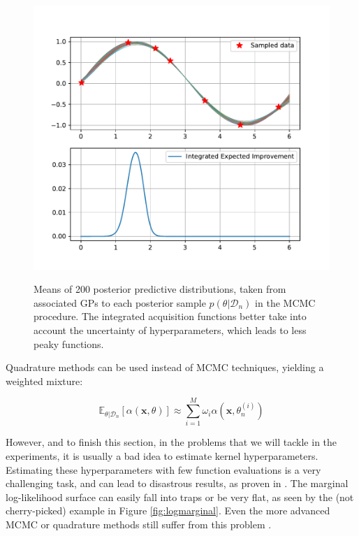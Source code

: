 \documentclass[10pt,a4paper,twoside]{book}
\begin{document}
\begin{figure}
\centering
\caption{Means of 200 posterior predictive distributions, taken from associated GPs to each posterior sample $p(\theta|\mathcal{D}_n)$ in the MCMC procedure. The integrated acquisition functions better take into account the uncertainty of hyperparameters, which leads to less peaky functions.}
\includegraphics[width=\textwidth]{figures/chapter3/integratedacq}
\label{fig:integratedacq}
\end{figure}


Quadrature methods can be used instead of MCMC techniques, yielding a weighted mixture:

\begin{equation}
\mathbb{E}_{\theta|\mathcal{D}_n}\left[ \alpha(\boldsymbol{x},\theta )\right] \approx \sum_{i=1}^M \omega_i \alpha(\boldsymbol{x},\theta_n^{(i)})
\end{equation}

However, and to finish this section, in the problems that we will tackle in the experiments, it is usually a bad idea to estimate kernel hyperparameters. Estimating these hyperparameters with few function evaluations is a very challenging task, and can lead to disastrous results, as proven in \cite{Benassi2011, Bull2011}. The marginal log-likelihood surface can easily fall into traps or be very flat, as seen by the (not cherry-picked) example in Figure \ref{fig:logmarginal}. Even the more advanced MCMC or quadrature methods still suffer from this problem \cite{Wang2014}.
\end{document}
